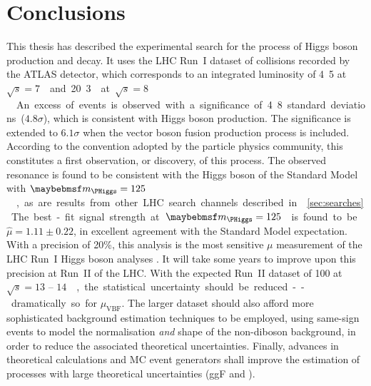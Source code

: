 
\chapter{Conclusions}
\label{chap:thesis_conclusions}

This thesis has described the experimental search for the \ggHWWlvlv process of Higgs boson 
production and decay. It uses the LHC Run~I dataset of \pp collisions recorded by the ATLAS 
detector, which corresponds to an integrated luminosity of \unit{4.5}{\invfb} at 
\unit{$\sqrt{s} = 7$}{\TeV} and \unit{20.3}{\invfb} at \unit{$\sqrt{s} = 8$}{\TeV}. 
An excess of events is observed with a significance of 4.8 standard deviations ($4.8\sigma$), 
which is consistent with Higgs boson production. The significance is extended to $6.1\sigma$ 
when the vector boson fusion production process is included. According to the convention 
adopted by the particle physics community, this constitutes a first observation, or 
discovery, of this process. The observed resonance is found to be consistent with the Higgs 
boson of the Standard Model with \unit{$\mH = 125$}{\GeV}, as are results from other LHC 
search channels described in \Section~\ref{sec:searches}.

The best-fit signal strength at \unit{$\mH = 125$}{\GeV} is found to be 
$\hat{\mu} = 1.11 \pm 0.22$, in excellent agreement with the Standard Model expectation. With 
a precision of 20\%, this \HWW analysis is the most sensitive $\mu$ measurement of the LHC 
Run~I Higgs boson analyses \cite{ATLAS:Hgg:RunI,ATLAS:HZZ:RunI,CMS:Hgamgam,CMS:HZZ,CMS:HWW}. 
It will take some years to improve upon this precision at Run~II of the LHC. With the 
expected Run~II dataset of \unit{100}{\invfb} at \unit{$\sqrt{s} = 13\text{ -- }14$}{\TeV}, 
the statistical uncertainty should be reduced -- dramatically so for $\mu_{\text{VBF}}$. 
The larger dataset should also afford more sophisticated background estimation techniques to 
be employed, \eg using same-sign events to model the normalisation \textit{and} shape of the 
non-\WW diboson background, in order to reduce the associated theoretical uncertainties. 
Finally, advances in theoretical calculations and MC event generators shall improve the 
estimation of processes with large theoretical uncertainties (\eg ggF and \WW).




